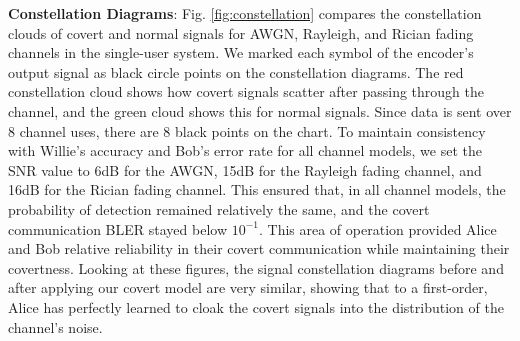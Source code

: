\textbf{Constellation Diagrams}: Fig. \ref{fig:constellation} compares the constellation clouds of covert and normal signals for AWGN, Rayleigh, and Rician fading channels in the single-user system. We marked each symbol of the encoder's output signal as black circle points on the constellation diagrams. The red constellation cloud shows how covert signals scatter after passing through the channel, and the green cloud shows this for normal signals. Since data is sent over 8 channel uses, there are 8 black points on the chart. To maintain consistency with Willie's accuracy and Bob's error rate for all channel models, we set the SNR value to 6dB for the AWGN, 15dB for the Rayleigh fading channel, and 16dB for the Rician fading channel. This ensured that, in all channel models, the probability of detection remained relatively the same, and the covert communication BLER stayed below \(10^{-1}\). This area of operation provided Alice and Bob relative reliability in their covert communication while maintaining their covertness.
Looking at these figures, the signal constellation diagrams before and after applying our covert model are very similar, showing that to a first-order, Alice has perfectly learned to cloak the covert signals into the distribution of the channel's noise.